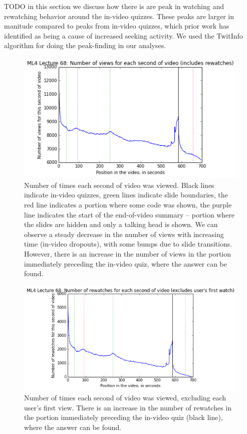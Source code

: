 \documentclass[letterpaper]{article}
\begin{document}
TODO in this section we discuss how there is are peak in watching and rewatching behavior around the in-video quizzes. These peaks are larger in manitude compared to peaks from in-video quizzes, which prior work has identified as being a cause of increased seeking activity. We used the TwitInfo algorithm for doing the peak-finding in our analyses.

\begin{figure}
\includegraphics[width=1.0\columnwidth]{videoviewsall}
\caption{Number of times each second of video was viewed. Black lines indicate in-video quizzes, green lines indicate slide boundaries, the red line indicates a portion where some code was shown, the purple line indicates the start of the end-of-video summary -- portion where the slides are hidden and only a talking head is shown. We can observe a steady decrease in the number of views with increasing time (in-video dropouts), with some bumps due to slide transitions. However, there is an increase in the number of views in the portion immediately preceding the in-video quiz, where the answer can be found.}
\label{fig:videoviewsall}
\end{figure}

\begin{figure}
\includegraphics[width=1.0\columnwidth]{rewatches}
\caption{Number of times each second of video was viewed, excluding each user's first view. There is an increase in the number of rewatches in the portion immediately preceding the in-video quiz (black line), where the answer can be found.}
\label{fig:rewatches}
\end{figure}
\end{document}
